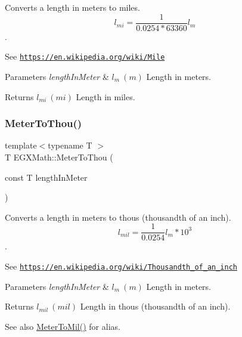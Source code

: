 Converts a length in meters to miles. \[ l_{mi}=\frac{1}{0.0254 * 63360} l_{m} \]. 

See \href{https://en.wikipedia.org/wiki/Mile}{\tt https\+://en.\+wikipedia.\+org/wiki/\+Mile} 
\begin{DoxyParams}{Parameters}
{\em length\+In\+Meter} & $ l_{m}\ (m)$ Length in meters. \\
\hline
\end{DoxyParams}
\begin{DoxyReturn}{Returns}
$ l_{mi}\ (mi)$ Length in miles. 
\end{DoxyReturn}
\mbox{\label{group___e_g_x_math-_conversions-_length_conversions-_meter-_imperial_gaebe39a6b8485aae53724390225f27a66}} 
\subsubsection{\texorpdfstring{Meter\+To\+Thou()}{MeterToThou()}}
{\footnotesize\ttfamily template$<$typename T $>$ \\
T E\+G\+X\+Math\+::\+Meter\+To\+Thou (\begin{DoxyParamCaption}\item[{const T}]{length\+In\+Meter }\end{DoxyParamCaption})}



Converts a length in meters to thous (thousandth of an inch). \[ l_{mil}= \frac{1}{0.0254} l_{m} * 10^{3} \]. 

See \href{https://en.wikipedia.org/wiki/Thousandth_of_an_inch}{\tt https\+://en.\+wikipedia.\+org/wiki/\+Thousandth\+\_\+of\+\_\+an\+\_\+inch} 
\begin{DoxyParams}{Parameters}
{\em length\+In\+Meter} & $ l_{m}\ (m)$ Length in meters. \\
\hline
\end{DoxyParams}
\begin{DoxyReturn}{Returns}
$ l_{mil}\ (mil)$ Length in thous (thousandth of an inch). 
\end{DoxyReturn}
\begin{DoxySeeAlso}{See also}
\mbox{\hyperlink{group___e_g_x_math-_conversions-_length_conversions-_meter-_imperial_ga6a58893d0f7e17e425c7bd0b3235320d}{Meter\+To\+Mil()}} for alias. 
\end{DoxySeeAlso}
\mbox{\label{group___e_g_x_math-_conversions-_length_conversions-_meter-_imperial_ga958e4dfc661ba34f49bc3aaebe6e30be}} 
